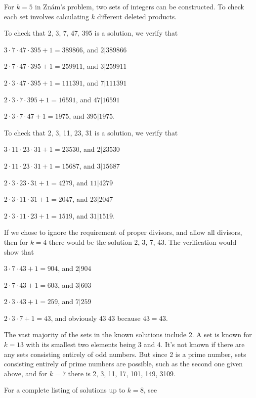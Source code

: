 \documentclass[12pt]{article}
\begin{document}
For $k = 5$ in Zn\'am's problem, two sets of integers can be constructed. To check each set involves calculating $k$ different deleted products.

To check that 2, 3, 7, 47, 395 is a solution, we verify that

$3 \cdot 7 \cdot 47 \cdot 395 + 1 = 389866$, and $2|389866$

$2 \cdot 7 \cdot 47 \cdot 395 + 1 = 259911$, and $3|259911$

$2 \cdot 3 \cdot 47 \cdot 395 + 1 = 111391$, and $7|111391$

$2 \cdot 3 \cdot 7 \cdot 395 + 1 = 16591$, and $47|16591$

$2 \cdot 3 \cdot 7 \cdot 47 + 1 = 1975$, and $395|1975$.

To check that 2, 3, 11, 23, 31 is a solution, we verify that

$3 \cdot 11 \cdot 23 \cdot 31 + 1 = 23530$, and $2|23530$

$2 \cdot 11 \cdot 23 \cdot 31 + 1 = 15687$, and $3|15687$

$2 \cdot 3 \cdot 23 \cdot 31 + 1 = 4279$, and $11|4279$

$2 \cdot 3 \cdot 11 \cdot 31 + 1 = 2047$, and $23|2047$

$2 \cdot 3 \cdot 11 \cdot 23 + 1 = 1519$, and $31|1519$.

If we chose to ignore the requirement of proper divisors, and allow all divisors, then for $k = 4$ there would be the solution 2, 3, 7, 43. The verification would show that

$3 \cdot 7  \cdot  43 + 1 = 904$, and $2|904$

$2 \cdot 7  \cdot  43 + 1 = 603$, and $3|603$

$2 \cdot 3  \cdot  43 + 1 = 259$, and $7|259$

$2 \cdot 3  \cdot  7 + 1 = 43$, and obviously $43|43$ because $43 = 43$.

The vast majority of the sets in the known solutions include 2. A set is known for $k = 13$ with its smallest two elements being 3 and 4. It's not known if there are any sets consisting entirely of odd numbers. But since 2 is a prime number, sets consisting entirely of prime numbers are possible, such as the second one given above, and for $k = 7$ there is 2, 3, 11, 17, 101, 149, 3109.

For a complete listing of solutions up to $k = 8$, see 
\end{document}

